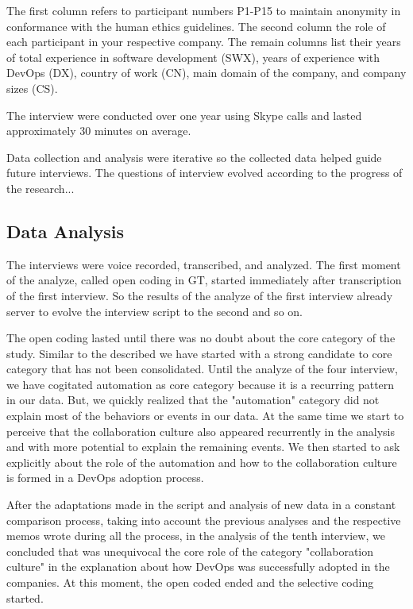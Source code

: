The first column refers to participant numbers P1-P15 to maintain anonymity in
conformance with the human ethics guidelines. The second column the role of
each participant in your respective company. The remain columns list their
years of total experience in software development (SWX), years of experience
with DevOps (DX), country of work (CN), main domain of the company, and company
sizes (CS).

The interview were conducted over one year using Skype calls and lasted
approximately 30 minutes on average.

Data collection and analysis were iterative so the collected data helped guide
future interviews. The questions of interview evolved according to the progress
of the research...

\subsection{Data Analysis}
The interviews were voice recorded, transcribed, and analyzed. The first moment
of the analyze, called open coding in GT, started immediately after
transcription of the first interview. So the results of the analyze of the
first interview already server to evolve the interview script to the second and
so on.

The open coding lasted until there was no doubt about the core category of the
study. Similar to the described \cite{adolph2012reconciling} we have started
with a strong candidate to core category that has not been consolidated. Until
the analyze of the four interview, we have cogitated automation as core
category because it is a recurring pattern in our data. But, we quickly
realized that the "automation" category did not explain most of the behaviors
or events in our data. At the same time we start to perceive that the
collaboration culture also appeared recurrently in the analysis and with more
potential to explain the remaining events. We then started to ask explicitly
about the role of the automation and how to the collaboration culture is formed
in a DevOps adoption process.

After the adaptations made in the script and analysis of new data in a constant
comparison process, taking into account the previous analyses and the
respective memos wrote during all the process, in the analysis of the tenth
interview, we concluded that was unequivocal the core role of the
category "collaboration culture" in the explanation about how DevOps was
successfully adopted in the companies. At this moment, the open coded ended
and the selective coding started.


